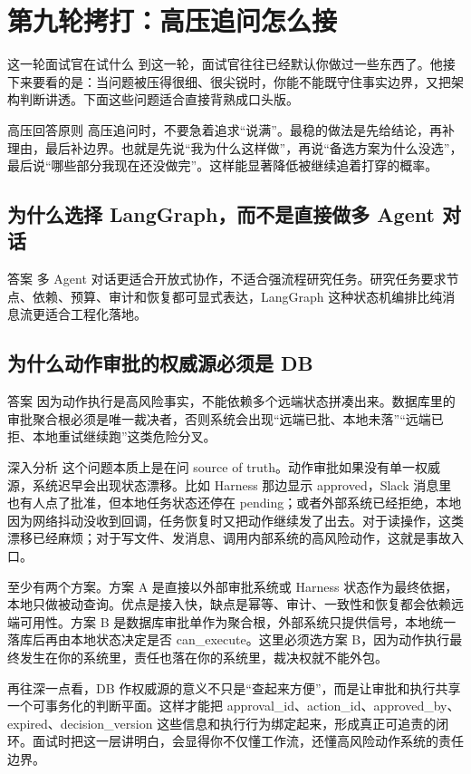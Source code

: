 \documentclass[12pt]{article}
\begin{document}
\section{第九轮拷打：高压追问怎么接}

\begin{summaryBox}{这一轮面试官在试什么}
到这一轮，面试官往往已经默认你做过一些东西了。他接下来要看的是：当问题被压得很细、很尖锐时，你能不能既守住事实边界，又把架构判断讲透。下面这些问题适合直接背熟成口头版。
\end{summaryBox}

\begin{riskBox}{高压回答原则}
高压追问时，不要急着追求“说满”。最稳的做法是先给结论，再补理由，最后补边界。也就是先说“我为什么这样做”，再说“备选方案为什么没选”，最后说“哪些部分我现在还没做完”。这样能显著降低被继续追着打穿的概率。
\end{riskBox}

\subsection{为什么选择 LangGraph，而不是直接做多 Agent 对话}
\begin{qaBox}{答案}
多 Agent 对话更适合开放式协作，不适合强流程研究任务。研究任务要求节点、依赖、预算、审计和恢复都可显式表达，LangGraph 这种状态机编排比纯消息流更适合工程化落地。
\end{qaBox}

\subsection{为什么动作审批的权威源必须是 DB}
\begin{qaBox}{答案}
因为动作执行是高风险事实，不能依赖多个远端状态拼凑出来。数据库里的审批聚合根必须是唯一裁决者，否则系统会出现“远端已批、本地未落”“远端已拒、本地重试继续跑”这类危险分叉。
\end{qaBox}

\begin{analysisBox}{深入分析}
这个问题本质上是在问 source of truth。动作审批如果没有单一权威源，系统迟早会出现状态漂移。比如 Harness 那边显示 approved，Slack 消息里也有人点了批准，但本地任务状态还停在 pending；或者外部系统已经拒绝，本地因为网络抖动没收到回调，任务恢复时又把动作继续发了出去。对于读操作，这类漂移已经麻烦；对于写文件、发消息、调用内部系统的高风险动作，这就是事故入口。

至少有两个方案。方案 A 是直接以外部审批系统或 Harness 状态作为最终依据，本地只做被动查询。优点是接入快，缺点是幂等、审计、一致性和恢复都会依赖远端可用性。方案 B 是数据库审批单作为聚合根，外部系统只提供信号，本地统一落库后再由本地状态决定是否 can\_execute。这里必须选方案 B，因为动作执行最终发生在你的系统里，责任也落在你的系统里，裁决权就不能外包。

再往深一点看，DB 作权威源的意义不只是“查起来方便”，而是让审批和执行共享一个可事务化的判断平面。这样才能把 approval\_id、action\_id、approved\_by、expired、decision\_version 这些信息和执行行为绑定起来，形成真正可追责的闭环。面试时把这一层讲明白，会显得你不仅懂工作流，还懂高风险动作系统的责任边界。
\end{analysisBox}
\end{document}
